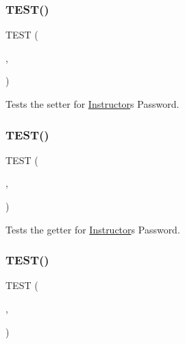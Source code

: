 \subsubsection{\texorpdfstring{T\+E\+S\+T()}{TEST()}\hspace{0.1cm}{\footnotesize\ttfamily [34/54]}}
{\footnotesize\ttfamily T\+E\+ST (\begin{DoxyParamCaption}\item[{instructor\+Test}]{,  }\item[{set\+Instr\+Password\+Test}]{ }\end{DoxyParamCaption})}

Tests the setter for \hyperlink{classInstructor}{Instructor}\textquotesingle{}s Password. \mbox{\label{group__group2_ga4415465f8a128f4b26959e7299b6ec6f}} 
\subsubsection{\texorpdfstring{T\+E\+S\+T()}{TEST()}\hspace{0.1cm}{\footnotesize\ttfamily [35/54]}}
{\footnotesize\ttfamily T\+E\+ST (\begin{DoxyParamCaption}\item[{instructor\+Test}]{,  }\item[{get\+Instr\+Password\+Test}]{ }\end{DoxyParamCaption})}

Tests the getter for \hyperlink{classInstructor}{Instructor}\textquotesingle{}s Password. \mbox{\label{group__group2_ga1eef3dd6afd1cfd3bfcced9fd734492c}} 
\subsubsection{\texorpdfstring{T\+E\+S\+T()}{TEST()}\hspace{0.1cm}{\footnotesize\ttfamily [36/54]}}
{\footnotesize\ttfamily T\+E\+ST (\begin{DoxyParamCaption}\item[{instructor\+Test}]{,  }\item[{set\+Instr\+Id\+Test}]{ }\end{DoxyParamCaption})}


